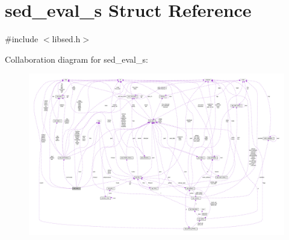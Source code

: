 \hypertarget{structsed__eval__s}{}\section{sed\+\_\+eval\+\_\+s Struct Reference}
\label{structsed__eval__s}


{\ttfamily \#include $<$libsed.\+h$>$}



Collaboration diagram for sed\+\_\+eval\+\_\+s\+:
\nopagebreak
\begin{figure}[H]
\begin{center}
\leavevmode
\includegraphics[width=350pt]{structsed__eval__s__coll__graph}
\end{center}
\end{figure}
